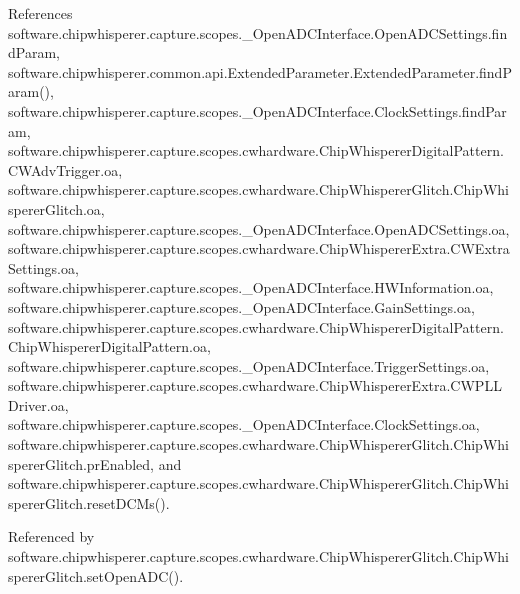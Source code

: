 References software.\+chipwhisperer.\+capture.\+scopes.\+\_\+\+Open\+A\+D\+C\+Interface.\+Open\+A\+D\+C\+Settings.\+find\+Param, software.\+chipwhisperer.\+common.\+api.\+Extended\+Parameter.\+Extended\+Parameter.\+find\+Param(), software.\+chipwhisperer.\+capture.\+scopes.\+\_\+\+Open\+A\+D\+C\+Interface.\+Clock\+Settings.\+find\+Param, software.\+chipwhisperer.\+capture.\+scopes.\+cwhardware.\+Chip\+Whisperer\+Digital\+Pattern.\+C\+W\+Adv\+Trigger.\+oa, software.\+chipwhisperer.\+capture.\+scopes.\+cwhardware.\+Chip\+Whisperer\+Glitch.\+Chip\+Whisperer\+Glitch.\+oa, software.\+chipwhisperer.\+capture.\+scopes.\+\_\+\+Open\+A\+D\+C\+Interface.\+Open\+A\+D\+C\+Settings.\+oa, software.\+chipwhisperer.\+capture.\+scopes.\+cwhardware.\+Chip\+Whisperer\+Extra.\+C\+W\+Extra\+Settings.\+oa, software.\+chipwhisperer.\+capture.\+scopes.\+\_\+\+Open\+A\+D\+C\+Interface.\+H\+W\+Information.\+oa, software.\+chipwhisperer.\+capture.\+scopes.\+\_\+\+Open\+A\+D\+C\+Interface.\+Gain\+Settings.\+oa, software.\+chipwhisperer.\+capture.\+scopes.\+cwhardware.\+Chip\+Whisperer\+Digital\+Pattern.\+Chip\+Whisperer\+Digital\+Pattern.\+oa, software.\+chipwhisperer.\+capture.\+scopes.\+\_\+\+Open\+A\+D\+C\+Interface.\+Trigger\+Settings.\+oa, software.\+chipwhisperer.\+capture.\+scopes.\+cwhardware.\+Chip\+Whisperer\+Extra.\+C\+W\+P\+L\+L\+Driver.\+oa, software.\+chipwhisperer.\+capture.\+scopes.\+\_\+\+Open\+A\+D\+C\+Interface.\+Clock\+Settings.\+oa, software.\+chipwhisperer.\+capture.\+scopes.\+cwhardware.\+Chip\+Whisperer\+Glitch.\+Chip\+Whisperer\+Glitch.\+pr\+Enabled, and software.\+chipwhisperer.\+capture.\+scopes.\+cwhardware.\+Chip\+Whisperer\+Glitch.\+Chip\+Whisperer\+Glitch.\+reset\+D\+C\+Ms().



Referenced by software.\+chipwhisperer.\+capture.\+scopes.\+cwhardware.\+Chip\+Whisperer\+Glitch.\+Chip\+Whisperer\+Glitch.\+set\+Open\+A\+D\+C().


